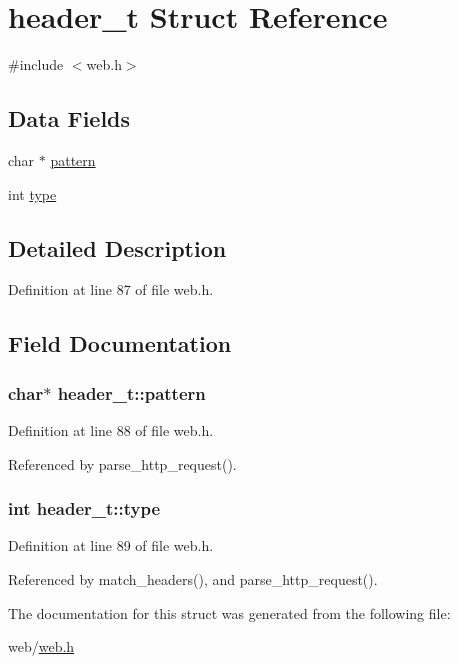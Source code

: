 \hypertarget{structheader__t}{}\section{header\+\_\+t Struct Reference}
\label{structheader__t}


{\ttfamily \#include $<$web.\+h$>$}

\subsection*{Data Fields}
\begin{DoxyCompactItemize}
\item 
char $\ast$ \hyperlink{structheader__t_a389d7564d1b1fd7b7ace82e15525e18c}{pattern}
\item 
int \hyperlink{structheader__t_a1f179d0a706f9ec29e1ac8ef9e67b8af}{type}
\end{DoxyCompactItemize}


\subsection{Detailed Description}


Definition at line 87 of file web.\+h.



\subsection{Field Documentation}
\subsubsection[{\texorpdfstring{pattern}{pattern}}]{\setlength{\rightskip}{0pt plus 5cm}char$\ast$ header\+\_\+t\+::pattern}\hypertarget{structheader__t_a389d7564d1b1fd7b7ace82e15525e18c}{}\label{structheader__t_a389d7564d1b1fd7b7ace82e15525e18c}


Definition at line 88 of file web.\+h.



Referenced by parse\+\_\+http\+\_\+request().

\subsubsection[{\texorpdfstring{type}{type}}]{\setlength{\rightskip}{0pt plus 5cm}int header\+\_\+t\+::type}\hypertarget{structheader__t_a1f179d0a706f9ec29e1ac8ef9e67b8af}{}\label{structheader__t_a1f179d0a706f9ec29e1ac8ef9e67b8af}


Definition at line 89 of file web.\+h.



Referenced by match\+\_\+headers(), and parse\+\_\+http\+\_\+request().



The documentation for this struct was generated from the following file\+:\begin{DoxyCompactItemize}
\item 
web/\hyperlink{web_8h}{web.\+h}\end{DoxyCompactItemize}
